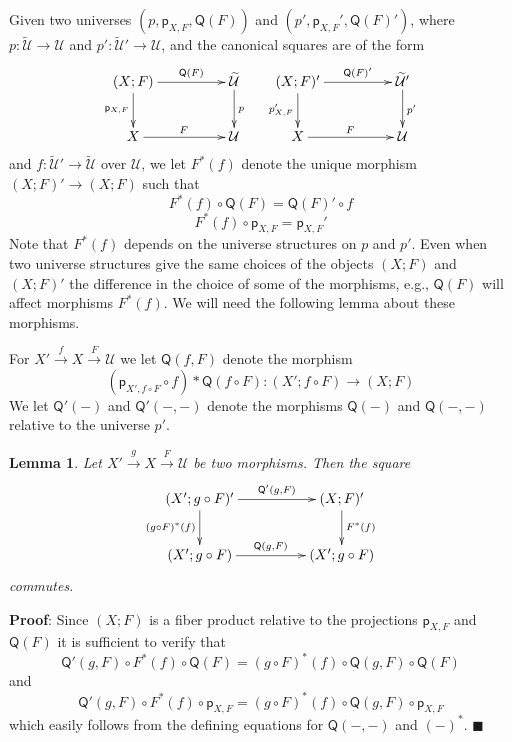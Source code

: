 \documentclass[12pt]{article}
\numberwithin{equation}{section}
\newenvironment{eq}{\begin{equation}}{\end{equation}}
\newenvironment{myproof}{{\bf Proof}:}{$\blacksquare$ \vskip 5mm }
\newtheorem{lemma}[proposition]{Lemma}
\newcommand{\sr}{\rightarrow}
\newcommand{\wt}{\widetilde}
\newcommand{\spc}{{\,\,\,\,\,\,\,}}
\newcommand{\p}{\mathsf{p}}
\newcommand{\U}{\mathcal{U}}
\newcommand{\Q}{\mathsf{Q}}
\begin{document}
Given two universes $(p,\p_{X,F},\Q(F))$ and $(p',\p_{X,F}',\Q(F)')$, where
$p:\wt{\U}\sr \U$ and $p':\wt{\U}'\sr \U$, and the canonical squares are of the form
%
$$
\begin{xy}
          \xymatrix@C=4pc{ (X;F) \ar[r]^-{\Q(F)} \ar[d]_{\p_{X,F}} & \wt{\U}
            \ar[d]^{p}\\ X \ar[r]^{F} & \U }
\end{xy}
\spc
\begin{xy}
          \xymatrix@C=4pc{ (X;F)' \ar[r]^-{\Q(F)'} \ar[d]_{p'_{X,F}} & \wt{\U}'
            \ar[d]^{p'}\\ X \ar[r]^{F} & \U }
\end{xy}
$$
%
and $f:\wt{\U}'\sr \wt{\U}$ over $\U$, we let $F^*(f)$ denote the unique morphism
$(X;F)'\sr (X;F)$ such that
%
\begin{eq}\label{2015.04.08.eq3}
F^*(f)\circ \Q(F)=\Q(F)'\circ f
\end{eq}%
%
\begin{eq}\label{2015.04.08.eq4}
F^*(f)\circ \p_{X,F}=\p_{X,F}'
\end{eq}%
%
Note that $F^*(f)$ depends on the universe structures on $p$ and $p'$. Even
when two universe structures give the same choices of the objects $(X;F)$ and
$(X;F)'$ the difference in the choice of some of the morphisms, e.g., $\Q(F)$
will affect morphisms $F^*(f)$. We will need the following lemma about these
morphisms.

For $X'\stackrel{f}{\sr}X \stackrel{F}{\sr}\U$ we let $\Q(f,F)$ denote the
morphism
%
$$(\p_{X',f\circ F}\circ f)*\Q(f\circ F):(X';f\circ F)\sr (X;F)$$
%
We let $\Q'(-)$ and $\Q'(-,-)$ denote the morphisms $\Q(-)$ and $\Q(-,-)$ relative
to the universe $p'$.
%
\begin{lemma}
\label{2015.04.20.l1} Let $X'\stackrel{g}{\sr}X\stackrel{F}{\sr}\U$ be two
morphisms. Then the square
%
$$
\begin{xy}
          \xymatrix@C=4pc{ (X';g\circ F)' \ar[r]^-{\Q'(g,F)} \ar[d]_{(g\circ
              F)^*(f)} & (X;F)' \ar[d]^{F^*(f)}\\ (X';g\circ F) \ar[r]^{\Q(g,F)}
            & (X';g\circ F) }
\end{xy}
$$
%
commutes.
%
\end{lemma}
%
\begin{myproof}
Since $(X;F)$ is a fiber product relative to the projections $\p_{X,F}$ and
$\Q(F)$ it is sufficient to verify that
%
$$\Q'(g,F)\circ F^*(f)\circ \Q(F)=(g\circ F)^*(f) \circ \Q(g,F)\circ \Q(F)$$
%
and
%
$$\Q'(g,F)\circ F^*(f)\circ \p_{X,F}=(g\circ F)^*(f) \circ \Q(g,F)\circ \p_{X,F}$$
%
which easily follows from the defining equations for $\Q(-,-)$ and $(-)^*$.
\end{myproof}
\end{document}
